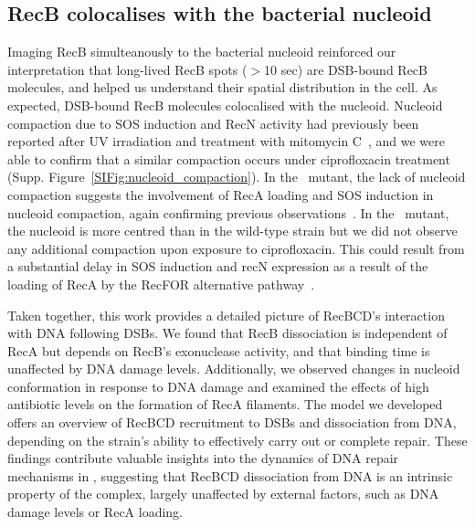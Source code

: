 \subsection*{RecB colocalises with the bacterial nucleoid}
Imaging RecB simulteanously to the bacterial nucleoid reinforced our interpretation that long-lived RecB spots ($>$10 sec) are DSB-bound RecB molecules, and helped us understand their spatial distribution in the cell. As expected, DSB-bound RecB molecules colocalised with the nucleoid. Nucleoid compaction due to SOS induction and RecN activity had previously been reported after UV irradiation and treatment with mitomycin C~\cite{Odsbu2014,Vickridge2017}, and we were able to confirm that a similar compaction occurs under ciprofloxacin treatment (Supp. Figure~\ref{SIFig:nucleoid_compaction}). In the \dreca\ mutant, the lack of nucleoid compaction suggests the involvement of RecA loading and SOS induction in nucleoid compaction, again confirming previous observations~\cite{Odsbu2014,Vickridge2017}. In the \geneteneighty\ mutant, the nucleoid is more centred than in the wild-type strain but we did not observe any additional compaction upon exposure to ciprofloxacin. This could result from a substantial delay in SOS induction and recN expression as a result of the loading of RecA by the RecFOR alternative pathway~\cite{Lepore2025}.

Taken together, this work provides a detailed picture of RecBCD's interaction with DNA following DSBs. We found that RecB dissociation is independent of RecA but depends on RecB's exonuclease activity, and that binding time is unaffected by DNA damage levels. Additionally, we observed changes in nucleoid conformation in response to DNA damage and examined the effects of high antibiotic levels on the formation of RecA filaments. The model we developed offers an overview of RecBCD recruitment to DSBs and dissociation from DNA, depending on the strain's ability to effectively carry out or complete repair.
These findings contribute valuable insights into the dynamics of DNA repair mechanisms in \ecoli, suggesting that RecBCD dissociation from DNA is an intrinsic property of the complex, largely unaffected by external factors, such as DNA damage levels or RecA loading.